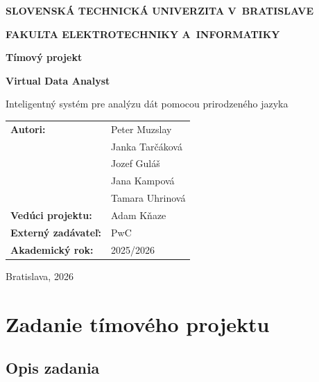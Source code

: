 \documentclass[a4paper, 12pt]{article}
\begin{document}

\begin{titlepage}
\centering

{\Large\textbf{SLOVENSKÁ TECHNICKÁ UNIVERZITA V~BRATISLAVE}\par}
\vspace{0.4cm}
{\large\textbf{FAKULTA ELEKTROTECHNIKY A~INFORMATIKY}\par}

\vfill

{\LARGE\textbf{Tímový projekt}\par}
\vspace{1.2cm}
{\Huge\textbf{Virtual Data Analyst}\par}
\vspace{0.8cm}
{\Large Inteligentný systém pre analýzu dát pomocou prirodzeného jazyka\par}

\vfill

\begin{flushleft}
\begin{tabular}{ll}
\textbf{Autori:} & Peter Muzslay \\
                 & Janka Tarčáková \\
                 & Jozef Guláš \\
                 & Jana Kampová \\
                 & Tamara Uhrinová \\
\textbf{Vedúci projektu:} & Adam Kňaze \\
\textbf{Externý zadávateľ:} & PwC \\
\textbf{Akademický rok:} & 2025/2026 \\
\end{tabular}
\end{flushleft}

\vfill

{\large Bratislava, 2026\par}

\end{titlepage}
\setcounter{page}{2}

\clearpage
\section*{Zadanie tímového projektu}

\subsection*{Opis zadania}
\end{document}
